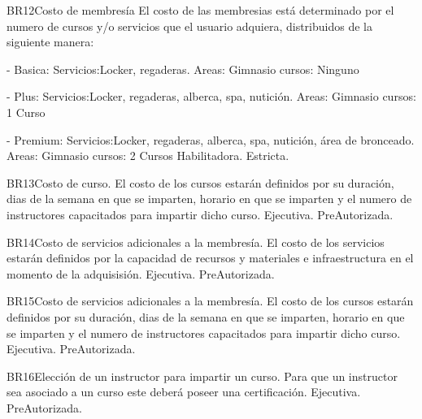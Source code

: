 \begin{BussinesRule}{BR12}{Costo de membresía}
	\BRitem[Descripción:] El costo de las membresias está determinado por el numero de cursos y/o servicios que el usuario adquiera, distribuidos de la siguiente manera:

- Basica: 
		Servicios:Locker, regaderas.			
			Areas: Gimnasio
			cursos: Ninguno

- Plus: 
		Servicios:Locker, regaderas, alberca, spa, nutición.
			Areas: Gimnasio
			cursos: 1 Curso

- Premium: 
		Servicios:Locker, regaderas, alberca, spa, nutición, área de bronceado.
			Areas: Gimnasio
			cursos: 2 Cursos
	\BRitem[Tipo:] Habilitadora.
	\BRitem[Nivel:] Estricta.
\end{BussinesRule}

\begin{BussinesRule}{BR13}{Costo de curso.} 
	\BRitem[Descripción:] El costo de los cursos estarán definidos por su duración, dias de la semana en que se imparten, horario en que se imparten y el numero de instructores capacitados para impartir dicho curso.
	\BRitem[Tipo:] Ejecutiva.
	\BRitem[Nivel:] PreAutorizada.
\end{BussinesRule}

\begin{BussinesRule}{BR14}{Costo de servicios adicionales a la membresía.} 
	\BRitem[Descripción:] El costo de los servicios estarán definidos por la capacidad de recursos y materiales e infraestructura en el momento de la adquisisión.
	\BRitem[Tipo:] Ejecutiva.
	\BRitem[Nivel:] PreAutorizada.
\end{BussinesRule}

\begin{BussinesRule}{BR15}{Costo de servicios adicionales a la membresía.} 
	\BRitem[Descripción:] El costo de los cursos estarán definidos por su duración, dias de la semana en que se imparten, horario en que se imparten y el numero de instructores capacitados para impartir dicho curso.
	\BRitem[Tipo:] Ejecutiva.
	\BRitem[Nivel:] PreAutorizada.
\end{BussinesRule}

\begin{BussinesRule}{BR16}{Elección de un instructor para impartir un curso.} 
	\BRitem[Descripción:] Para que un instructor sea asociado a un curso este deberá poseer una certificación.
	\BRitem[Tipo:] Ejecutiva.
	\BRitem[Nivel:] PreAutorizada.
\end{BussinesRule}

